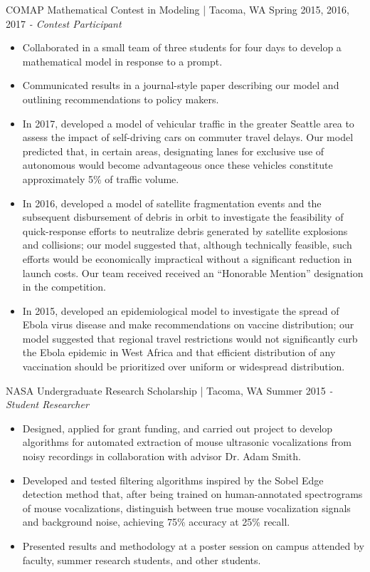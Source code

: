 COMAP Mathematical Contest in Modeling | Tacoma, WA \hfill Spring 2015, 2016, 2017 \newline
\textit{- Contest Participant} \\
\vspace{-4.5mm}
\begin{itemize}
  \item Collaborated in a small team of three students for four days to develop a mathematical model in response to a prompt.
  \item Communicated results in a journal-style paper describing our model and outlining recommendations to policy makers.
  \item In 2017, developed a model of vehicular traffic in the greater Seattle area to assess the impact of self-driving cars on commuter travel delays. Our model predicted that, in certain areas, designating lanes for exclusive use of autonomous would become advantageous once these vehicles constitute approximately 5\% of traffic volume.
  \item In 2016, developed a model of satellite fragmentation events and the subsequent disbursement of debris in orbit to investigate the feasibility of quick-response efforts to neutralize debris generated by satellite explosions and collisions; our model suggested that, although technically feasible, such efforts would be economically impractical without a significant reduction in launch costs. Our team received received an ``Honorable Mention'' designation in the competition.
  \item In 2015, developed an epidemiological model to investigate the spread of Ebola virus disease and make recommendations on vaccine distribution; our model suggested that regional travel restrictions would not significantly curb the Ebola epidemic in West Africa and that efficient distribution of any vaccination should be prioritized over uniform or widespread distribution.
\end{itemize}
\vspace{-3.5mm}

NASA Undergraduate Research Scholarship | Tacoma, WA \hfill Summer 2015 \newline
\textit{- Student Researcher} \\
  \vspace{-4.5mm}
 \begin{itemize}
 \item Designed, applied for grant funding, and carried out project to develop algorithms for automated extraction of mouse ultrasonic vocalizations from noisy recordings in collaboration with advisor Dr. Adam Smith.
 \item Developed and tested filtering algorithms inspired by the Sobel Edge detection method that, after being trained on human-annotated spectrograms of mouse vocalizations, distinguish between true mouse vocalization signals and background noise, achieving 75\% accuracy at 25\% recall.
 \item Presented results and methodology at a poster session on campus attended by faculty, summer research students, and other students.
 \end{itemize}
  \vspace{-3.5mm}


